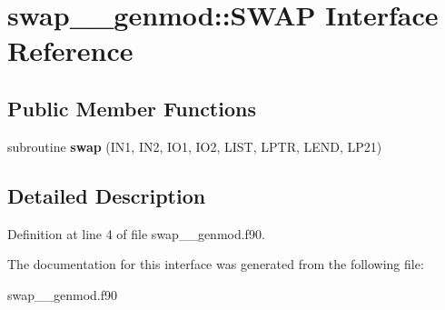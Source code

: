 \hypertarget{interfaceswap____genmod_1_1_s_w_a_p}{\section{swap\+\_\+\+\_\+genmod\+:\+:S\+W\+A\+P Interface Reference}
\label{interfaceswap____genmod_1_1_s_w_a_p}
}
\subsection*{Public Member Functions}
\begin{DoxyCompactItemize}
\item 
\hypertarget{interfaceswap____genmod_1_1_s_w_a_p_afe367c9cf63a0913701dd921d7e3db6b}{subroutine {\bfseries swap} (I\+N1, I\+N2, I\+O1, I\+O2, L\+I\+S\+T, L\+P\+T\+R, L\+E\+N\+D, L\+P21)}\label{interfaceswap____genmod_1_1_s_w_a_p_afe367c9cf63a0913701dd921d7e3db6b}

\end{DoxyCompactItemize}


\subsection{Detailed Description}


Definition at line 4 of file swap\+\_\+\+\_\+genmod.\+f90.



The documentation for this interface was generated from the following file\+:\begin{DoxyCompactItemize}
\item 
swap\+\_\+\+\_\+genmod.\+f90\end{DoxyCompactItemize}
